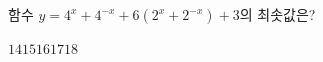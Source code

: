 함수 $y=4^x+4^{-x}+6(2^x+2^{-x})+3$의 최솟값은?
\begin{choices32}{$14$}{$15$}{$16$}{$17$}{$18$}\end{choices32}
